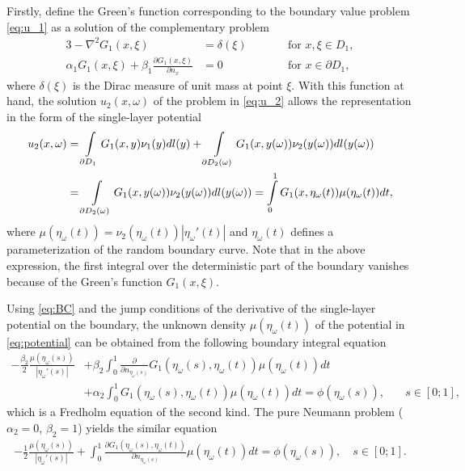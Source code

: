 Firstly, define the Green's function corresponding to the boundary value problem \eqref{eq:u_1} as a solution of the complementary problem
\begin{alignat}{3} \label{eq:GF_2}
	-\nabla^2 G_1(x,\xi)                                                     & = \delta(\xi)  &\qquad &\text{for } x, \xi \in D_1,
	\\ \label{eq:GF_BC}
	\alpha_1 G_1(x,\xi) + \beta_1 \frac{\partial G_1(x,\xi)}{\partial n_x}   & = 0  &\qquad &\text{for } x \in \partial D_1,
\end{alignat}
where $\delta(\xi)$ is the Dirac measure of unit mass at point $\xi$.
With this function at hand, the solution $u_2(x,\omega)$ of the problem in \eqref{eq:u_2} allows the representation in the form of the single-layer potential \cite{Jaswon1963,Symm1963}
\begin{align} \label{eq:potential}
	\nonumber
	u_2(x,\omega) &= \int\displaylimits_{\partial D_1} G_1(x,y) \nu_1(y) d l(y) + \int\displaylimits_{\partial D_2(\omega)} G_1(x,y(\omega)) \nu_2(y(\omega)) d l(y(\omega))
	\\
	&= \int\displaylimits_{\partial D_2(\omega)} G_1(x,y(\omega)) \nu_2(y(\omega)) d l(y(\omega))
	= \int\displaylimits_0^1 G_1(x,\eta_{\omega}(t)) \mu(\eta_{\omega}(t)) dt,
\end{align}
where $\mu(\eta_{\omega}(t)) = \nu_2(\eta_{\omega}(t)) \left| \eta_{\omega}'(t) \right|$ and $\eta_{\omega}(t)$ defines a  parameterization of the random boundary curve.
Note that in the above expression, the first integral over the deterministic part of the boundary vanishes because of the Green's function $G_1(x,\xi)$. 


Using \eqref{eq:BC} and the jump conditions of the derivative of the single-layer potential on the boundary, the unknown density $\mu(\eta_{\omega}(t))$ of the potential in \eqref{eq:potential} can be obtained from the following boundary integral equation
\begin{align} \label{eq:BIE}
    - \frac{\beta_2}{2} \frac{\mu(\eta_{\omega}(s))}{\left| \eta_{\omega}'(s) \right|} 
    &+ \beta_2 \int_0^1 \frac{\partial}{\partial n_{\eta_{\omega}(s)}} G_1(\eta_{\omega}(s),\eta_{\omega}(t)) \mu(\eta_{\omega}(t)) dt
    \\ \nonumber
    &+ \alpha_2 \int_0^1 G_1(\eta_{\omega}(s),\eta_{\omega}(t)) \mu(\eta_{\omega}(t)) dt 
	=
	\phi(\eta_{\omega}(s)),&
	\quad
	s \in [0;1],&
\end{align}
which is a Fredholm equation of the second kind.
The pure Neumann problem ($\alpha_2=0$, $\beta_2=1$) yields the similar equation
\begin{align} \label{eq:Neumann_BIE}
	-\frac{1}{2} \frac{\mu(\eta_{\omega}(s))}{\left| \eta_{\omega}'(s) \right|} + \int_0^1 \frac{\partial G_1(\eta_{\omega}(s),\eta_{\omega}(t))}{\partial n_{\eta_{\omega}(s)}} \mu(\eta_{\omega}(t)) dt
	=
	\phi(\eta_{\omega}(s)),
	\quad
	s \in [0;1].
\end{align}

